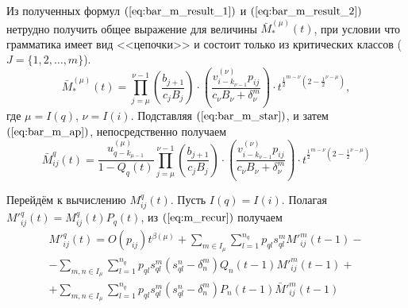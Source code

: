 \documentclass[11pt]{article}
\begin{document}
Из полученных формул $(\ref{eq:bar_m_result_1})$ и $(\ref{eq:bar_m_result_2})$ нетрудно получить общее выражение для величины $\bar{M}^{(\mu)}_*(t)$, при условии что грамматика имеет вид <<цепочки>> и состоит только из критических классов ($J = \{1,2,\ldots,m\}$).
\begin{equation}
    \bar{M}^{(\mu)}_*(t) = \prod_{j = \mu}^{\nu-1} \left( \frac{ b_{j+1} }{ c_j B_j } \right) \cdot \left( \frac{ v^{(\nu)}_{i - k_{\nu-1}} p_{ij} }{ c_\nu B_\nu + \delta^m_\nu } \right) \cdot t^{ \frac{1}{2}^{m - \nu} \left(2 - \frac{1}{2}^{\nu - \mu} \right) },
\end{equation}
где $\mu = I(q)$, $\nu = I(i)$. Подставляя $(\ref{eq:bar_m_star})$, и затем $(\ref{eq:bar_m_ap})$, непосредственно получаем
\begin{equation}
    \bar{M}^q_{ij}(t) = \frac{ u^{(\mu)}_{q - k_{\mu-1}} }{ 1 - Q_q(t) } \prod_{j = \mu}^{\nu-1} \left( \frac{ b_{j+1} }{ c_j B_j } \right) \cdot \left( \frac{ v^{(\nu)}_{i - k_{\nu-1}} p_{ij} }{ c_\nu B_\nu + \delta^m_\nu } \right) \cdot t^{ \frac{1}{2}^{m - \nu} \left(2 - \frac{1}{2}^{\nu - \mu} \right) }
\end{equation}

Перейдём к вычислению $M^q_{ij}(t)$. Пусть $I(q) = I(i)$. Полагая $M'^q_{ij}(t) = M^q_{ij}(t) P_q(t)$, из $(\ref{eq:m_recur})$ получаем
\begin{multline}
\label{eq:m_ap_first}
    M'^q_{ij}(t) = O(p_{ij}) t^{\beta(\mu)} + \sum_{m \in I_\mu} \sum_{l = 1}^{n_q} p_{ql} s_{ql}^m M'^m_{ij}(t-1) - \\
    - \sum_{m,n \in I_\mu} \sum_{l = 1}^{n_q} p_{ql} s_{ql}^m (s_{ql}^n - \delta^m_n) Q_n(t-1) M'^m_{ij}(t-1) + \\
    + \sum_{m,n \in I_\mu} \sum_{l = 1}^{n_q} p_{ql} s_{ql}^m (s_{ql}^n - \delta^m_n) P_n(t-1) \bar{M}'^m_{ij}(t-1)
\end{multline}
\end{document}
